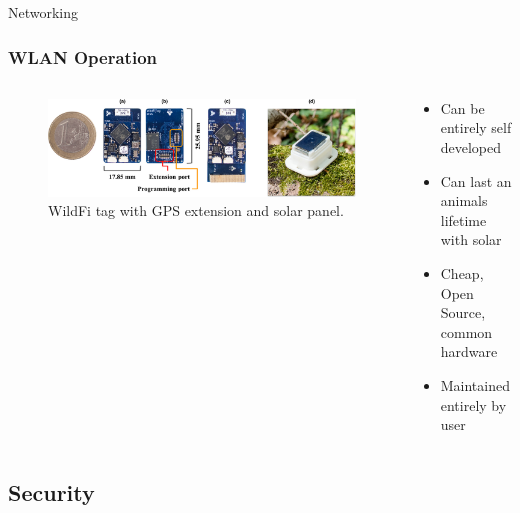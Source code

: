 \documentclass{beamer}
\begin{document}
  \begin{frame}{Networking}
    \frametitle{WLAN Operation}
    \begin{columns}
      \begin{column}{0.5\textwidth}
        \begin{figure}[htbp]
          \centering
          \includegraphics[width=\textwidth]{WildFi_Tag.jpg}
          \caption{WildFi tag with GPS extension and solar panel.\cite{wild2023internet}}
          \label{fig:WildFi_Tag}
        \end{figure}
      \end{column}
      \begin{column}{0.5\textwidth}
        \begin{itemize}
          \item Can be entirely self developed
          \item Can last an animals lifetime with solar
          \item Cheap, Open Source, common hardware
          \item Maintained entirely by user
        \end{itemize}
      \end{column}
    \end{columns}
  \end{frame}

\subsection{Security}
\end{document}

